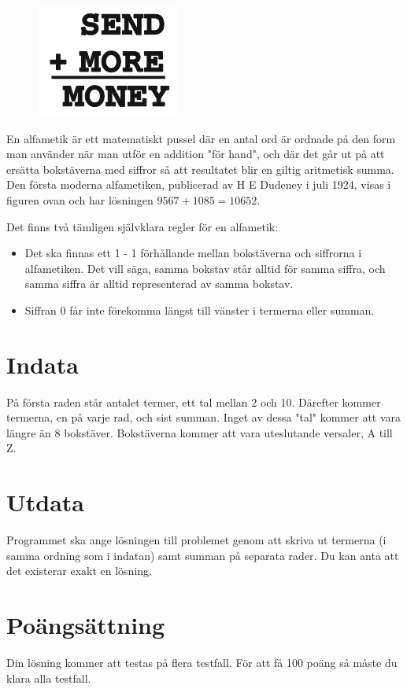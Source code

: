 
\begin{figure}
   \centering
	\includegraphics{alfametik}
\end{figure}

En alfametik är ett matematiskt pussel där en antal ord är ordnade på den form man använder när man utför en addition "för hand", och där det går ut på att ersätta bokstäverna med siffror så att resultatet blir en giltig aritmetisk summa. Den första moderna alfametiken, publicerad av H E Dudeney i juli 1924, visas i figuren ovan och har lösningen $9567 + 1085 = 10652$.

Det finns två tämligen självklara regler för en alfametik: 

\begin{itemize}

\item Det ska finnas ett 1 - 1 förhållande mellan bokstäverna och siffrorna i alfametiken. Det vill säga, samma bokstav står alltid för samma siffra, och samma siffra är alltid representerad av samma bokstav.

\item Siffran 0 får inte förekomma längst till vänster i termerna eller summan.

\end{itemize}

\section*{Indata}
På första raden står antalet termer, ett tal mellan 2 och 10. Därefter kommer termerna, en på varje rad, och sist summan. Inget av dessa "tal" kommer att vara längre än 8 bokstäver. Bokstäverna kommer att vara uteslutande versaler, A till Z. 

\section*{Utdata}
Programmet ska ange lösningen till problemet genom att skriva ut termerna (i samma ordning som i indatan) samt summan på separata rader. Du kan anta att det existerar exakt en lösning. 


\section*{Poängsättning}
Din lösning kommer att testas på flera testfall. För att få 100 poäng så måste du klara alla testfall.

